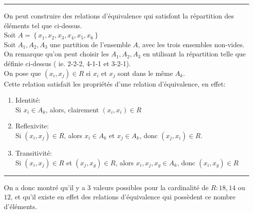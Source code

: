 \documentclass[11pt, a4paper]{article}
\newcommand\hr{
    \noindent\rule[0.5ex]{\linewidth}{0.5pt}\newline
}
\begin{document}
\hr
On peut construire des relations d'équivalence qui satisfont la répartition des éléments tel que ci-dessus.\\
Soit $A = \left\{ x_1,x_2,x_3,x_4,x_5,x_6 \right\} $\\
Soit $ A_1, A_2, A_3$	une partition de l'ensemble $A$, avec les trois ensembles non-vides.\\
On remarque qu'on peut choisir les $ A_1, A_2, A_3$ en utilisant la répartition telle que définie ci-dessus ( ie. 2-2-2, 4-1-1 et 3-2-1).\\
On pose que $( x_i,x_j ) \in R$ si $x_i$ et $x_j$ sont dans le même $A_k$.\\
Cette relation satisfait les propriétés d'une relation d'équivalence, en effet:
\begin{enumerate}
	\item Identité:\\
		Si $x_i \in A_k$, alors, clairement $(x_i, x_i) \in R$
	\item Reflexivite:\\
		Si $( x_i,x_j) \in R $, alors $x_i \in A_k$ et $x_j \in A_k$, donc $(x_j, x_i) \in R$.
	\item Transitivité:\\
		Si $(x_i, x_j) \in R$ et $(x_j,x_g) \in R$, alors $x_i,x_j, x_g \in A_k$, donc $(x_i,x_g) \in R$
\end{enumerate}
\hr
On a donc montré qu'il y a 3 valeurs possibles pour la cardinalité de $R: 18,14$ ou $12$, et qu'il existe en effet des relations d'équivalence qui possèdent ce nombre d'éléments.
\end{document}
